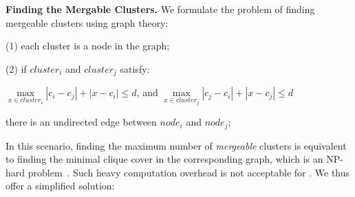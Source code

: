 \begin{comment}
\begin{proof}
Denote the cluster size of $cluster_k$ to be $n_k$.After merging, the new center will be: $\mathit{c'= \frac{\sum_{i=1}^m n_{k_i}c_{k_i}}{\sum_{i=1}^m n_{k_i}}}$.
For $\forall i \in [1,m],\forall x \in cluster_{k_i}$, it holds that:
\begin{equation}
\label{eq.tri}
\begin{aligned}
        |x-c'| &\leq |x-c_{k_i}|+|c_{k_i}-c'|\  (Triangle\  inequality)\\
        &=|x-c_{k_i}|+| \frac{\sum_{j=1}^m n_{k_j}}{\sum_{j=1}^m n_{k_j}}c_{k_i}-
        \frac{\sum_{j=1}^m n_{k_j}c_{k_j}}{\sum_{j=1}^m n_{k_j}}|\\
        &=|x-c_{k_i}|+| 
         \frac{\sum_{j=1}^m n_{k_j}(c_{k_i}-c_{k_j})}{\sum_{j=1}^m n_{k_j}}|\\
        &=|x-c_{k_i}|+\frac{|\sum_{j=1}^m n_{k_j}(c_{k_i}-c_{k_j})|}{\sum_{j=1}^m n_{k_j}}\\
        &\leq |x-c_{k_i}|+\frac{\sum_{j=1}^m n_{k_j}|c_{k_i}-c_{k_j}|}{\sum_{j=1}^m n_{k_j}}\\
        &= \frac{\sum_{j=1}^m n_{k_j}(|c_{k_i}-c_{k_j}|+|x-c_{k_i}|)}{\sum_{j=1}^m n_{k_j}}\\
        &\leq \frac{\sum_{j=1}^m n_{k_j}d}{\sum_{j=1}^m n_{k_j}} =d
\end{aligned}
\end{equation}
\end{proof}
\end{comment}

\noindent\textbf{Finding the Mergable Clusters.} We formulate the problem of finding mergeable clusters using graph theory: 

(1) each cluster is a node in the graph; 

(2) if $cluster_i$ and $cluster_j$ satisfy:

$\mathop{max}\limits_{x \in cluster_{i}} |c_{i}-c_{j}|+|x-c_{i}| \leq d$, and
$\mathop{max}\limits_{x \in cluster_{j}} |c_{j}-c_{i}|+|x-c_{j}| \leq d$

there is an undirected edge between $node_i$ and $node_j$;

In this scenario, finding the maximum number of \textit{mergeable} clusters is equivalent to finding the minimal clique cover in the corresponding graph, which is an NP-hard problem~\cite{karp1972reducibility}. 
Such heavy computation overhead is not acceptable for \system. We thus offer a simplified solution:

